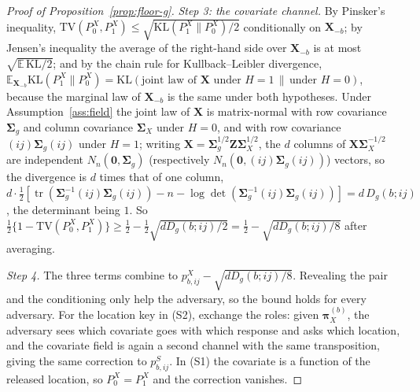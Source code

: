 \documentclass[11pt]{article}
\theoremstyle{definition}
\newcommand{\bX}{\mathbf{X}}
\newcommand{\bzero}{\mathbf{0}}
\newcommand{\bSig}{\boldsymbol{\Sigma}}
\newcommand{\bpi}{\boldsymbol{\pi}}
\newcommand{\E}{\mathbb{E}}
\newcommand{\tr}{\operatorname{tr}}
\begin{document}
\begin{proof}[Proof of Proposition~\ref{prop:floor-g}]
\emph{Step 3: the covariate channel.} By Pinsker's inequality, $\mathrm{TV}(P_0^X,P_1^X)\le\sqrt{\mathrm{KL}(P_1^X\|P_0^X)/2}$ conditionally on $\bX_{-b}$; by Jensen's inequality the average of the right-hand side over $\bX_{-b}$ is at most $\sqrt{\E\,\mathrm{KL}/2}$; and by the chain rule for Kullback--Leibler divergence, $\E_{\bX_{-b}}\mathrm{KL}(P_1^X\|P_0^X)=\mathrm{KL}(\text{joint law of }\bX\text{ under }H{=}1\,\|\,\text{under }H{=}0)$, because the marginal law of $\bX_{-b}$ is the same under both hypotheses. Under Assumption~\ref{ass:field} the joint law of $\bX$ is matrix-normal with row covariance $\bSig_g$ and column covariance $\bSig_X$ under $H=0$, and with row covariance $(ij)\bSig_g(ij)$ under $H=1$; writing $\bX=\bSig_g^{1/2}\mathbf Z\bSig_X^{1/2}$, the $d$ columns of $\bX\bSig_X^{-1/2}$ are independent $N_n(\bzero,\bSig_g)$ (respectively $N_n(\bzero,(ij)\bSig_g(ij))$) vectors, so the divergence is $d$ times that of one column, $d\cdot\tfrac12[\tr(\bSig_g^{-1}(ij)\bSig_g(ij))-n-\log\det(\bSig_g^{-1}(ij)\bSig_g(ij))]=d\,D_g(b;ij)$, the determinant being $1$. So $\tfrac12\{1-\mathrm{TV}(P_0^X,P_1^X)\}\ge\tfrac12-\tfrac12\sqrt{dD_g(b;ij)/2}=\tfrac12-\sqrt{dD_g(b;ij)/8}$ after averaging.

\emph{Step 4.} The three terms combine to $p^X_{b,ij}-\sqrt{dD_g(b;ij)/8}$. Revealing the pair and the conditioning only help the adversary, so the bound holds for every adversary. For the location key in (S2), exchange the roles: given $\bpi_X^{(b)}$, the adversary sees which covariate goes with which response and asks which location, and the covariate field is again a second channel with the same transposition, giving the same correction to $p^S_{b,ij}$. In (S1) the covariate is a function of the released location, so $P_0^X=P_1^X$ and the correction vanishes.
\end{proof}
\end{document}
